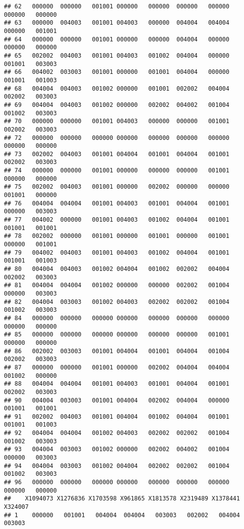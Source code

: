 \documentclass[
]{article}
\begin{document}
\begin{verbatim}
## 62   000000  000000   001001 000000   000000  000000   000000   000000   000000
## 63   000000  004003   001001 004003   000000  004004   004004   000000   001001
## 64   000000  000000   001001 000000   000000  004004   000000   000000   000000
## 65   002002  004003   001001 004003   001002  004004   000000   001001   003003
## 66   004002  003003   001001 000000   001001  004004   000000   001001   001003
## 68   004004  004003   001002 000000   001001  002002   004004   002002   003003
## 69   004004  004003   001002 000000   002002  004002   001004   001002   003003
## 70   000000  000000   001001 004003   000000  000000   001001   002002   003003
## 72   000000  000000   000000 000000   000000  000000   000000   000000   000000
## 73   002002  004003   001001 004004   001001  004004   001001   002002   003003
## 74   000000  000000   001001 000000   000000  000000   001001   000000   000000
## 75   002002  004003   001001 000000   002002  000000   000000   001001   000000
## 76   004004  004004   001001 004003   001001  004004   001001   000000   003003
## 77   004002  000000   001001 004003   001002  004004   001001   001001   001001
## 78   002002  000000   001001 000000   001001  000000   001001   000000   001001
## 79   004002  004003   001001 004003   001002  004004   001001   001001   001003
## 80   004004  004003   001002 004004   001002  002002   004004   002002   003003
## 81   004004  004004   001002 000000   000000  002002   001004   000000   003003
## 82   004004  003003   001002 004003   002002  002002   001004   001002   003003
## 84   000000  000000   000000 000000   000000  000000   000000   000000   000000
## 85   000000  000000   000000 000000   000000  000000   001001   000000   000000
## 86   002002  003003   001001 004004   001001  004004   001004   002002   003003
## 87   000000  000000   001001 000000   002002  004004   004004   001002   000000
## 88   004004  004004   001001 004003   001001  004004   001001   002002   003003
## 90   004004  003003   001001 004004   002002  004004   000000   001001   001001
## 91   002002  004003   001001 004004   001002  004004   001001   001001   001003
## 92   004004  004004   001002 004003   002002  002002   001004   001002   003003
## 93   004004  003003   001002 000000   002002  004002   001004   000000   003003
## 94   004004  003003   001002 004004   002002  002002   001004   001002   003003
## 96   000000  000000   000000 000000   000000  000000   000000   000000   000000
##    X1094073 X1276836 X1703598 X961865 X1813578 X2319489 X1378441 X324007
## 1    000000   001001   004004  004004   003003   002002   004004  003003

\end{verbatim}
\end{document}
